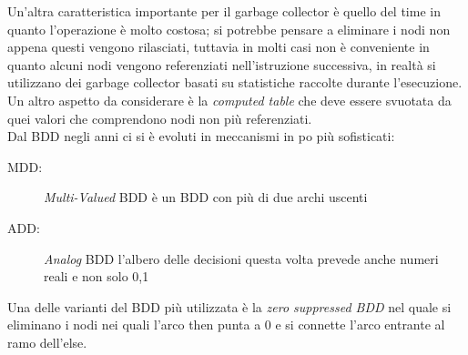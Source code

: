 Un'altra caratteristica importante per il garbage collector è quello del time in quanto l'operazione è molto costosa; si potrebbe pensare a eliminare i nodi non appena questi vengono rilasciati, tuttavia in molti casi non è conveniente in quanto alcuni nodi vengono referenziati nell'istruzione successiva, in realtà si utilizzano dei garbage collector basati su statistiche raccolte durante l'esecuzione. Un altro aspetto da considerare è la \emph{computed table} che deve essere svuotata da quei valori che comprendono nodi non più referenziati.\\
Dal BDD negli anni ci si è evoluti in meccanismi in po più sofisticati:
\begin{description}
\item[MDD:] \emph{Multi-Valued} BDD è un BDD con più di due archi uscenti
\item[ADD:] \emph{Analog} BDD l'albero delle decisioni questa volta prevede anche numeri reali e non solo 0,1
\end{description}
Una delle varianti del BDD più utilizzata è la \emph{zero suppressed BDD} nel quale si eliminano i nodi nei quali l'arco then punta a 0 e si connette l'arco entrante al ramo dell'else.

